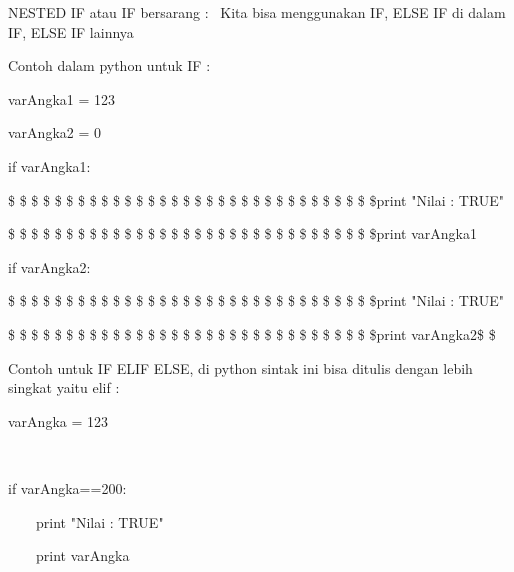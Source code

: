 \vspace{12pt}
\noindent 
NESTED IF atau IF bersarang :~ Kita bisa menggunakan IF, ELSE IF di dalam IF, ELSE IF lainnya \par
\vspace{12pt}
\noindent 
Contoh dalam python untuk IF :  \par
\vspace{12pt}
\noindent 
varAngka1 = 123 \par
\vspace{12pt}
\noindent 
varAngka2 = 0 \par
\vspace{12pt}
\noindent 
if varAngka1: \par
\vspace{12pt}
\noindent 
 \$  \$ \$  \$ \$  \$ \$  \$ \$ \$ \$  \$ \$  \$ \$  \$ \$  \$ \$  \$ \$  \$ \$  \$ \$  \$ \$  \$ \$  \$ \$  \$print "Nilai : TRUE" \par
\vspace{12pt}
\noindent 
 \$  \$ \$  \$ \$  \$ \$  \$ \$  \$ \$  \$ \$  \$ \$  \$ \$  \$ \$  \$ \$  \$ \$  \$ \$  \$ \$  \$ \$  \$ \$  \$print varAngka1 \par
\vspace{12pt}
\noindent 
if varAngka2: \par
\vspace{12pt}
\noindent 
 \$  \$ \$  \$ \$  \$ \$  \$ \$ \$ \$  \$ \$  \$ \$  \$ \$  \$ \$  \$ \$  \$ \$  \$ \$  \$ \$  \$ \$  \$ \$  \$print "Nilai : TRUE" \par
\vspace{12pt}
\noindent 
 \$  \$ \$  \$ \$  \$ \$  \$ \$ \$ \$  \$ \$  \$ \$  \$ \$  \$ \$  \$ \$  \$ \$  \$ \$  \$ \$  \$ \$  \$ \$  \$print varAngka2{\fontsize{14pt}{14pt}\selectfont  \$  \$ \\} \par
\vspace{12pt}
\noindent 
Contoh untuk IF ELIF ELSE, di python sintak ini bisa ditulis dengan lebih singkat yaitu elif :  \par
\vspace{12pt}
\noindent 
varAngka = 123 \par
\noindent 
 $  $ \par
\noindent 
if varAngka==200: \par
\vspace{12pt}
\noindent 
 $  $  $  $  $  $  $  $  $  $  $  $  $  $print "Nilai : TRUE" \par
\vspace{12pt}
\noindent 
 $  $  $  $  $  $  $  $  $  $  $  $  $  $print varAngka \par
